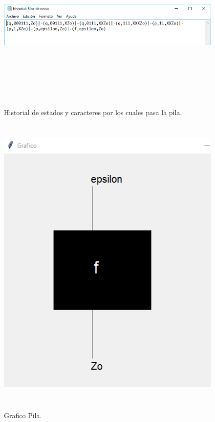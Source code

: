 \documentclass[12pt]{article}
\begin{document}
\begin{figure}[H]
\begin{center}
\includegraphics[width=\textwidth, height=8cm]{manual_pila_historial}
\label{ }
\caption{Historial de estados y caracteres por los cuales pasa la pila.}
\end{center}
\end{figure}

\begin{figure}[H]
\begin{center}
\includegraphics[width=\textwidth, height=15cm]{grafico_pila}
\label{ }
\caption{Grafico Pila.}
\end{center}
\end{figure}
\end{document}
